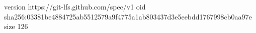 version https://git-lfs.github.com/spec/v1
oid sha256:03381be4884725ab5512579a9f4775a1ab803437d3e5eebdd1767998cb0aa97e
size 126
